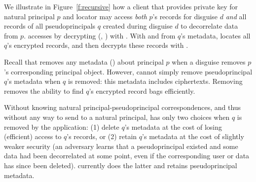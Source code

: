 
We illustrate in Figure~\ref{f:recursive} how a client that provides private key  for
natural principal $p$ and locator  may access \emph{both} $p$'s records for disguise $d$
\emph{and} all records of all pseudoprincipals $q$ created during disguise $d$ to decorrelate data
from $p$.  \sys accesses  by decrypting \enc(, ) with . With
 and  from $q$'s metadata, \sys locates all $q$'s encrypted records,
and then decrypts these records with .


Recall that \sys removes any metadata (\eg {}) about principal $p$ when a disguise removes
$p$'s corresponding principal object.
However, \sys cannot simply remove pseudoprincipal $q$'s metadata when $q$ is removed: this metadata
includes  ciphertexts. Removing  removes the ability to find $q$'s encrypted
record bags efficiently.

Without knowing natural principal-pseudoprincipal correspondences, and thus without any way to send
 to a natural principal, \sys has only two choices when $q$ is removed by the application:
(1) delete $q$'s metadata at the cost of losing (efficient) access to $q$'s records, or (2) retain
$q$'s metadata at the cost of slightly weaker security (an adversary learns that a pseudoprincipal
existed and some data had been decorrelated at some point, even if the corresponding user or data
has since been deleted). \sys currently does the latter and retains pseudoprincipal metadata.

